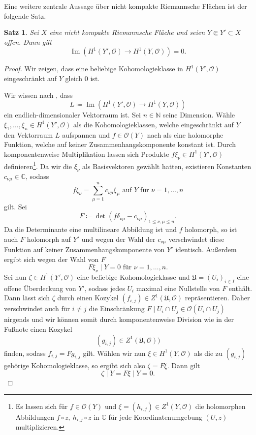 \documentclass[11pt,a4paper,toc=bibliography]{scrartcl}
\theoremstyle{def}
\theoremstyle{thm}
\newtheorem{satz}[defi]{Satz}
\theoremstyle{remark}
\DeclareMathOperator{\Ima}{Im}
\begin{document}
Eine weitere zentrale Aussage über nicht kompakte Riemannsche Flächen ist der folgende Satz.
\begin{satz}
Sei $X$ eine nicht kompakte Riemannsche Fläche und seien $Y\Subset Y'\subset X$ offen. Dann gilt
\[
\Ima \left(H^1(Y',\mathcal{O})\rightarrow H^1(Y,\mathcal{O})\right) = 0.
\]
\end{satz}
\nomenclature[Am]{$\Ima f$}{$=\{f(x);~x\in X\},$ Bild einer Funktion $f:X\rightarrow Y$}
\begin{proof}
	Wir zeigen, dass eine beliebige Kohomologieklasse in $H^1(Y',\mathcal{O})$ eingeschränkt auf $Y$ gleich $0$ ist.
	
	Wir wissen nach , dass 
	\[L\coloneqq \Ima\left(H^1(Y',\mathcal{O})\rightarrow H^1(Y,\mathcal{O})\right)\]
	ein endlich-dimensionaler Vektorraum ist. Sei $n\in\mathbb{N}$ seine Dimension. Wähle $\xi_1,\ldots,\xi_n\in H^1(Y',\mathcal{O})$ als die Kohomologieklassen, welche eingeschränkt auf $Y$ den Vektorraum $L$ aufspannen und $f\in\mathcal{O}(Y)$ nach  als eine holomorphe Funktion, welche auf keiner Zusammenhangskomponente konstant ist. Durch komponentenweise Multiplikation lassen sich Produkte $f\xi_\nu\in H^1(Y',\mathcal{O})$ definieren\footnote{
	Es lassen sich für $f\in\mathcal{O}(Y)$ und $\xi=(h_{i,j})\in Z^1(Y,\mathcal{O})$ die holomorphen Abbildungen $f\circ z,~h_{i,j}\circ z$ in $\mathbb{C}$ für jede Koordinatenumgebung $(U,z)$ multiplizieren.
	}. 
	Da wir die $\xi_\nu$ als Basisvektoren gewählt hatten, existieren Konstanten $c_{\nu\mu}\in\mathbb{C}$, sodass
	\[f\xi_\nu =\sum_{\mu=1}^n c_{\nu\mu}\xi_\mu \text{ auf } Y\text{ für } \nu=1,\ldots,n\]
	gilt. Sei
	\[
	F\coloneqq \det (f\delta_{\nu\mu}-c_{\nu\mu})_{1\leq\nu,\mu\leq n}.
	\]
	Da die Determinante eine multilineare Abbildung ist und $f$ holomorph, so ist auch $F$ holomorph auf $Y'$ und wegen der Wahl der $c_{\nu\mu}$ verschwindet diese Funktion auf keiner Zusammenhangskomponente von $Y'$ identisch. Außerdem ergibt sich wegen der Wahl von $F$
	\[
	F\xi_\nu\mid Y = 0\text{ für } \nu=1,\ldots,n.
	\]
	Sei nun $\zeta\in H^1(Y',\mathcal{O})$ eine beliebige Kohomologieklasse und $\mathfrak{U}=(U_i)_{i\in I}$ eine offene Überdeckung von $Y'$, sodass jedes $U_i$ maximal eine Nullstelle von $F$ enthält. Dann lässt sich $\zeta$ durch einen Kozykel $(f_{i,j})\in Z^1(\mathfrak{U},\mathcal{O})$ repräsentieren.
	Daher verschwindet auch für $i\neq j$ die Einschränkung $F\mid U_i\cap U_j\in \mathcal{O}(U_i\cap U_j)$ nirgends und wir können somit durch komponentenweise Division wie in der Fußnote einen Kozykel 
	\[(g_{i,j})\in Z^1(\mathfrak{U},\mathcal{O}))\]
	finden,
	sodass $f_{i,j}=Fg_{i,j}$ gilt. 
	Wählen wir nun $\xi\in H^1(Y,\mathcal{O})$ als die zu $(g_{i,j})$ gehörige Kohomologieklasse, so ergibt sich also $\zeta =F\xi$. Dann gilt
	\[\zeta\mid Y = F\xi\mid Y =0.\]
	\end{proof}
\end{document}
